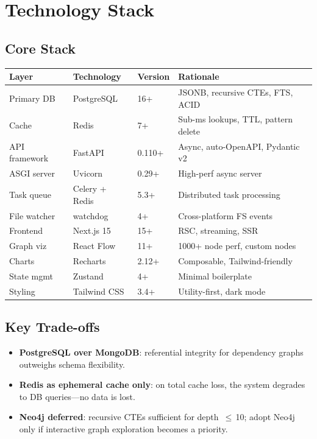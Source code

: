 \chapter{Technology Stack}

\section{Core Stack}

\begin{longtable}{@{}llll@{}}
\toprule
\textbf{Layer} & \textbf{Technology} & \textbf{Version} & \textbf{Rationale} \\
\midrule
\endhead
Primary DB    & PostgreSQL     & 16+    & JSONB, recursive CTEs, FTS, ACID \\
Cache         & Redis          & 7+     & Sub-ms lookups, TTL, pattern delete \\
API framework & FastAPI        & 0.110+ & Async, auto-OpenAPI, Pydantic v2 \\
ASGI server   & Uvicorn        & 0.29+  & High-perf async server \\
Task queue    & Celery + Redis & 5.3+   & Distributed task processing \\
File watcher  & watchdog       & 4+     & Cross-platform FS events \\
Frontend      & Next.js 15     & 15+    & RSC, streaming, SSR \\
Graph viz     & React Flow     & 11+    & 1000+ node perf, custom nodes \\
Charts        & Recharts       & 2.12+  & Composable, Tailwind-friendly \\
State mgmt    & Zustand        & 4+     & Minimal boilerplate \\
Styling       & Tailwind CSS   & 3.4+   & Utility-first, dark mode \\
\bottomrule
\end{longtable}

\section{Key Trade-offs}

\begin{itemize}
  \item \textbf{PostgreSQL over MongoDB}: referential integrity for dependency
        graphs outweighs schema flexibility.
  \item \textbf{Redis as ephemeral cache only}: on total cache loss, the system
        degrades to DB queries---no data is lost.
  \item \textbf{Neo4j deferred}: recursive CTEs sufficient for depth~$\leq$\,10;
        adopt Neo4j only if interactive graph exploration becomes a priority.
\end{itemize}

